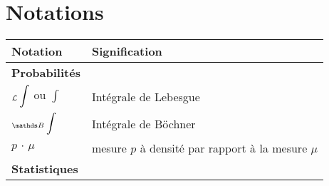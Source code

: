\section*{Notations}\label{notations}
\begin{tabularx}{\linewidth}{lX}
	\toprule
	\textbf{Notation}                                                                & \textbf{Signification}                                                                                                                                                                                                                              \\
	\midrule
	\textbf{Probabilités}                                                            &                                                                                                                                                                                                                                                     \\
	\midrule
	${}_{\mathcal{L}}\displaystyle\int$ ou $\displaystyle\int$                                                    & Intégrale de Lebesgue                                                                                                                                                                                                                               \\
	$\boch$                                                                          & Intégrale de Böchner                                                                                                                                                                                                                                \\
	$p \, \cdot \, \mu$                                                              & mesure $p$ à densité par rapport à la mesure $\mu$                                                                                                                                                                                                  \\
	\midrule
	\textbf{Statistiques}                                                            &                                                                                                                                                                                                                                                     \\

\end{tabularx}
